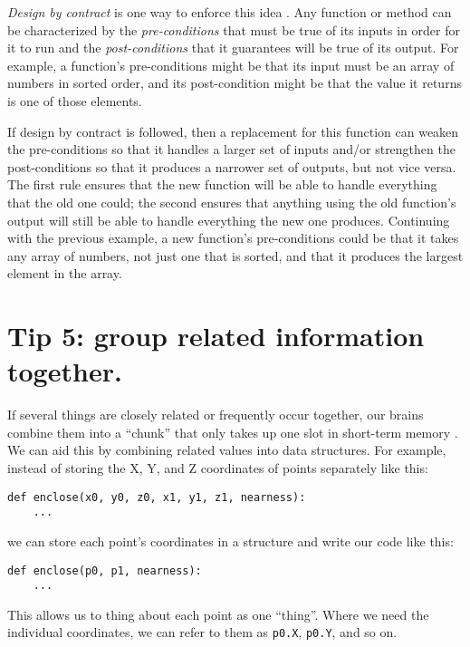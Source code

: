 \documentclass[10pt,letterpaper]{article}
\begin{document}
\emph{Design by contract} is one way to enforce this idea \cite{Meyer1994}.
Any function or method can be characterized by
the \emph{pre-conditions} that must be true of its inputs in order for it to run
and the \emph{post-conditions} that it guarantees will be true of its output.
For example,
a function's pre-conditions might be that its input must be
an array of numbers in sorted order,
and its post-condition might be that
the value it returns is one of those elements.

If design by contract is followed,
then a replacement for this function can weaken the pre-conditions
so that it handles a larger set of inputs
and/or strengthen the post-conditions
so that it produces a narrower set of outputs,
but not vice versa.
The first rule ensures that the new function will be able to handle
everything that the old one could;
the second ensures that anything using the old function's output
will still be able to handle everything the new one produces.
Continuing with the previous example,
a new function's pre-conditions could be that it takes any array of numbers,
not just one that is sorted,
and that it produces the largest element in the array.

\section*{Tip 5: group related information together.}

If several things are closely related or frequently occur together,
our brains combine them into a ``chunk''
that only takes up one slot in short-term memory \cite{Thalmann2019}.
We can aid this by combining related values into data structures.
For example,
instead of storing the X, Y, and Z coordinates of points separately like this:

\begin{lstlisting}
def enclose(x0, y0, z0, x1, y1, z1, nearness):
    ...
\end{lstlisting}

\noindent
we can store each point's coordinates in a structure
and write our code like this:

\begin{lstlisting}
def enclose(p0, p1, nearness):
    ...
\end{lstlisting}

\noindent
This allows us to thing about each point as one ``thing''.
Where we need the individual coordinates,
we can refer to them as \texttt{p0.X}, \texttt{p0.Y}, and so on.
\end{document}
